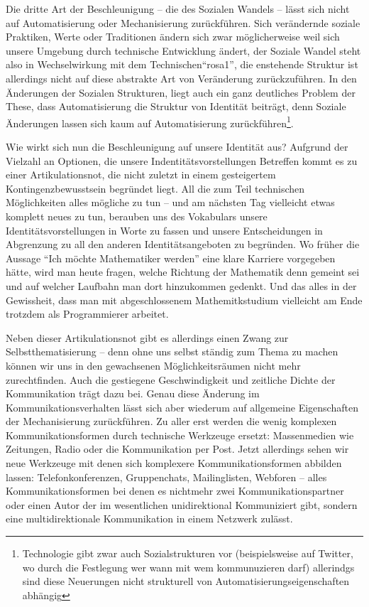 Die dritte Art der Beschleunigung – die des Sozialen Wandels – lässt sich nicht auf Automatisierung oder Mechanisierung zurückführen.
Sich verändernde soziale Praktiken, Werte oder Traditionen ändern sich zwar möglicherweise weil sich unsere Umgebung durch technische Entwicklung ändert,
der Soziale Wandel steht also in Wechselwirkung mit dem Technischen\enquote{rosa1}, die enstehende Struktur ist allerdings nicht auf diese abstrakte Art von Veränderung zurückzuführen.
In den Änderungen der Sozialen Strukturen, liegt auch ein ganz deutliches Problem der These, dass Automatisierung die Struktur von Identität beiträgt, denn Soziale Änderungen lassen sich kaum auf Automatisierung zurückführen\footnote{Technologie gibt zwar auch Sozialstrukturen vor (beispielsweise auf Twitter, wo durch die Festlegung wer wann mit wem kommunuzieren darf) allerindgs sind diese Neuerungen nicht strukturell von Automatisierungseigenschaften abhängig}.

Wie wirkt sich nun die Beschleunigung auf unsere Identität aus? Aufgrund der Vielzahl an Optionen, die unsere Indentitätsvorstellungen Betreffen kommt es zu einer Artikulationsnot, die nicht zuletzt in einem gesteigertem Kontingenzbewusstsein begründet liegt.
All die zum Teil technischen Möglichkeiten alles mögliche zu tun – und am nächsten Tag vielleicht etwas komplett neues zu tun, berauben uns des Vokabulars unsere Identitätsvorstellungen in Worte zu fassen und unsere Entscheidungen in Abgrenzung zu all den anderen Identitätsangeboten zu begründen.
Wo früher die Aussage \enquote{Ich möchte Mathematiker werden} eine klare Karriere vorgegeben hätte, wird man heute fragen, welche Richtung der Mathematik denn gemeint sei und auf welcher Laufbahn man dort hinzukommen gedenkt.
Und das alles in der Gewissheit, dass man mit abgeschlossenem Mathemitkstudium vielleicht am Ende trotzdem als Programmierer arbeitet.

Neben dieser Artikulationsnot gibt es allerdings einen Zwang zur Selbstthematisierung – denn ohne uns selbst ständig zum Thema zu machen können wir uns in den gewachsenen Möglichkeitsräumen nicht mehr zurechtfinden.
Auch die gestiegene Geschwindigkeit und zeitliche Dichte der Kommunikation trägt dazu bei.
Genau diese Änderung im Kommunikationsverhalten lässt sich aber wiederum auf allgemeine Eigenschaften der Mechanisierung zurückführen.
Zu aller erst werden die wenig komplexen Kommunikationsformen durch technische Werkzeuge ersetzt: Massenmedien wie Zeitungen, Radio oder die Kommunikation per Post. Jetzt allerdings sehen wir neue Werkzeuge mit denen sich komplexere Kommunikationsformen abbilden lassen: Telefonkonferenzen, Gruppenchats, Mailinglisten, Webforen – alles Kommunikationsformen bei denen es nichtmehr zwei Kommunikationspartner oder einen Autor der im wesentlichen unidirektional Kommuniziert gibt, sondern eine multidirektionale Kommunikation in einem Netzwerk zulässt.


